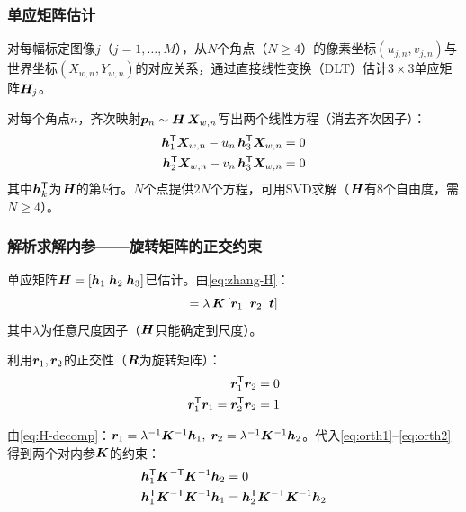 \subsubsection{单应矩阵估计}

对每幅标定图像$j$（$j = 1, \dots, M$），从$N$个角点（$N \ge 4$）的像素坐标$(u_{j,n}, v_{j,n})$与世界坐标$(X_{w,n}, Y_{w,n})$的对应关系，通过直接线性变换（DLT）估计$3\times 3$单应矩阵$\bm{H}_j$。

对每个角点$n$，齐次映射$\bm{p}_n \sim \bm{H}\,\bm{X}_{w,n}$写出两个线性方程（消去齐次因子）：
\begin{align}
\bm{h}_1^{\mathsf{T}}\bm{X}_{w,n} - u_n\,\bm{h}_3^{\mathsf{T}}\bm{X}_{w,n} &= 0 \label{eq:dlt-1} \\
\bm{h}_2^{\mathsf{T}}\bm{X}_{w,n} - v_n\,\bm{h}_3^{\mathsf{T}}\bm{X}_{w,n} &= 0 \label{eq:dlt-2}
\end{align}
其中$\bm{h}_k^{\mathsf{T}}$为$\bm{H}$的第$k$行。$N$个点提供$2N$个方程，可用SVD求解（$\bm{H}$有8个自由度，需$N \ge 4$）。

\subsubsection{解析求解内参——旋转矩阵的正交约束}

单应矩阵$\bm{H} = [\bm{h}_1\; \bm{h}_2\; \bm{h}_3]$已估计。由\eqref{eq:zhang-H}：
\begin{equation}
[\vect{h}_1 \;\; \vect{h}_2 \;\; \vect{h}_3] = \lambda\,\mat{K}\,[\vect{r}_1 \;\; \vect{r}_2 \;\; \vect{t}]
\label{eq:H-decomp}
\end{equation}
其中$\lambda$为任意尺度因子（$\bm{H}$只能确定到尺度）。

利用$\bm{r}_1,\bm{r}_2$的正交性（$\bm{R}$为旋转矩阵）：
\begin{align}
\bm{r}_1^{\mathsf{T}}\bm{r}_2 &= 0 \label{eq:orth1} \\
\bm{r}_1^{\mathsf{T}}\bm{r}_1 = \bm{r}_2^{\mathsf{T}}\bm{r}_2 &= 1 \label{eq:orth2}
\end{align}

由\eqref{eq:H-decomp}：$\bm{r}_1 = \lambda^{-1}\bm{K}^{-1}\bm{h}_1,\; \bm{r}_2 = \lambda^{-1}\bm{K}^{-1}\bm{h}_2$。代入\eqref{eq:orth1}--\eqref{eq:orth2}得到两个对内参$\bm{K}$的约束：
\begin{align}
\bm{h}_1^{\mathsf{T}}\bm{K}^{-\mathsf{T}}\bm{K}^{-1}\bm{h}_2 &= 0 \label{eq:con1} \\
\bm{h}_1^{\mathsf{T}}\bm{K}^{-\mathsf{T}}\bm{K}^{-1}\bm{h}_1 &=
\bm{h}_2^{\mathsf{T}}\bm{K}^{-\mathsf{T}}\bm{K}^{-1}\bm{h}_2 \label{eq:con2}
\end{align}

